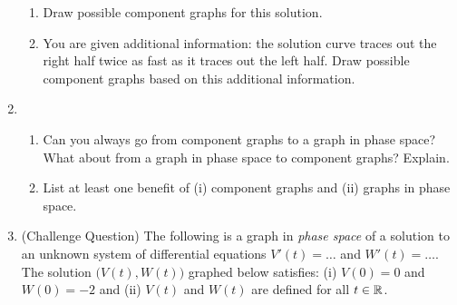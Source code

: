 \begin{enumerate}
\begin{center}
%
	\end{center}

	\begin{enumerate}
		\item Draw possible component graphs for this solution.
		\item You are given additional information: the solution curve traces out the right half 
		twice as fast as it traces out the left half.
		Draw possible component graphs based on this additional information.
	\end{enumerate}
	\item \begin{enumerate}
		\item Can you always go from component graphs to a graph in phase space? What about 
		from a graph in phase space to component graphs? Explain.
		\item List at least one benefit of (i) component graphs and (ii) graphs in phase space.
	\end{enumerate}
	
	\newpage

	\item (Challenge Question)
	The following is a graph in \emph{phase space} of a solution to an unknown system of differential equations
		$V'(t)=\ldots$ and $W'(t)=\ldots$. The solution $\Big(V(t),W(t)\Big)$ graphed below satisfies:
		(i) $V(0)=0$ and $W(0)=-2$ and (ii) $V(t)$ and $W(t)$ are defined for all $t\in \mathbb{R}$.

		\begin{center}
		\end{center}


\end{enumerate}
